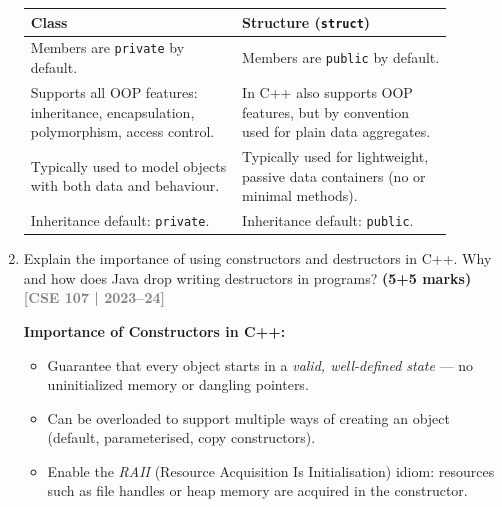 \documentclass[12pt,a3paper]{article}
\newcommand{\yr}[1]{\hfill\textcolor{gray}{\small\textbf{[#1]}}}
\newcommand{\mk}[1]{\textcolor{orange!70!black}{\small\textbf{(#1 marks)}}}
\begin{document}
\begin{enumerate}
\begin{tcolorbox}[enhanced,breakable,ansbox,colback=cA!4,colframe=cA,
  boxrule=0.8pt,arc=5pt,
  title={\textbf{Answer}},fonttitle=\bfseries\color{white},colbacktitle=cA]
\begin{center}
\small
\begin{tabular}{@{}p{0.44\linewidth}p{0.44\linewidth}@{}}
\toprule
\textbf{Class} & \textbf{Structure (\texttt{struct})} \\
\midrule
Members are \texttt{private} by default. &
Members are \texttt{public} by default. \\[3pt]
Supports all OOP features: inheritance,
encapsulation, polymorphism, access control. &
In C++ also supports OOP features, but by
convention used for plain data aggregates. \\[3pt]
Typically used to model objects with both
data and behaviour. &
Typically used for lightweight, passive data
containers (no or minimal methods). \\[3pt]
Inheritance default: \texttt{private}. &
Inheritance default: \texttt{public}. \\
\bottomrule
\end{tabular}
\end{center}

\end{tcolorbox}

\item Explain the importance of using constructors and destructors in C++. Why and how does Java drop writing destructors in programs? \mk{5+5}
\yr{CSE 107 | 2023--24}

\begin{tcolorbox}[enhanced,breakable,ansbox,colback=cA!4,colframe=cA,
  boxrule=0.8pt,arc=5pt,
  title={\textbf{Answer}},fonttitle=\bfseries\color{white},colbacktitle=cA]

\textbf{Importance of Constructors in C++:}
\begin{itemize}[itemsep=2pt]
  \item Guarantee that every object starts in a \emph{valid,
    well-defined state} --- no uninitialized memory or dangling
    pointers.
  \item Can be overloaded to support multiple ways of creating an
    object (default, parameterised, copy constructors).
  \item Enable the \emph{RAII} (Resource Acquisition Is
    Initialisation) idiom: resources such as file handles or heap
    memory are acquired in the constructor.
\end{itemize}


\end{tcolorbox}
\end{enumerate}
\end{document}

